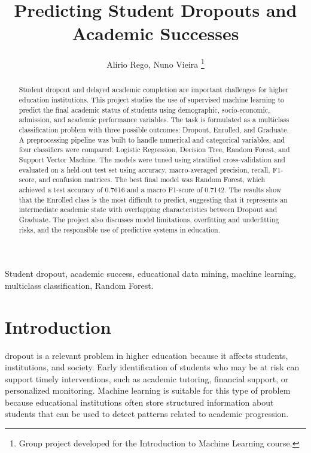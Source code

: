 \documentclass[lettersize,journal]{IEEEtran}
\begin{document}
\title{Predicting Student Dropouts and Academic Successes}

\author{Alírio Rego, Nuno Vieira%
\thanks{Group project developed for the Introduction to Machine Learning course.}}


\maketitle

\begin{abstract}
Student dropout and delayed academic completion are important challenges for higher education institutions. This project studies the use of supervised machine learning to predict the final academic status of students using demographic, socio-economic, admission, and academic performance variables. The task is formulated as a multiclass classification problem with three possible outcomes: Dropout, Enrolled, and Graduate. A preprocessing pipeline was built to handle numerical and categorical variables, and four classifiers were compared: Logistic Regression, Decision Tree, Random Forest, and Support Vector Machine. The models were tuned using stratified cross-validation and evaluated on a held-out test set using accuracy, macro-averaged precision, recall, F1-score, and confusion matrices. The best final model was Random Forest, which achieved a test accuracy of 0.7616 and a macro F1-score of 0.7142. The results show that the Enrolled class is the most difficult to predict, suggesting that it represents an intermediate academic state with overlapping characteristics between Dropout and Graduate. The project also discusses model limitations, overfitting and underfitting risks, and the responsible use of predictive systems in education.
\end{abstract}

\begin{IEEEkeywords}
Student dropout, academic success, educational data mining, machine learning, multiclass classification, Random Forest.
\end{IEEEkeywords}

\section{Introduction}
 dropout is a relevant problem in higher education because it affects students, institutions, and society. Early identification of students who may be at risk can support timely interventions, such as academic tutoring, financial support, or personalized monitoring. Machine learning is suitable for this type of problem because educational institutions often store structured information about students that can be used to detect patterns related to academic progression.
\end{document}
